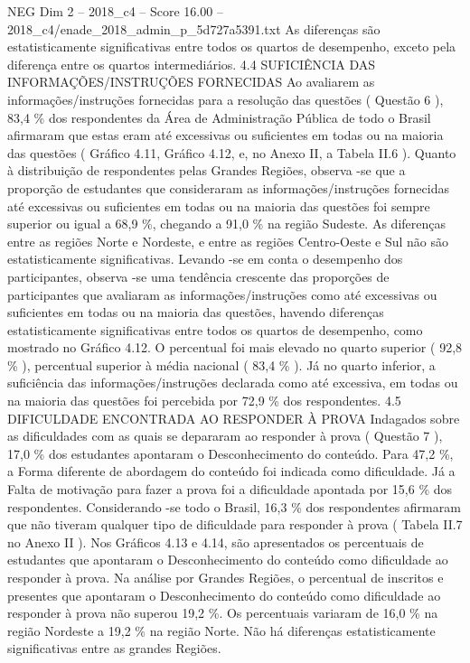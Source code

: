 \begin{textsample}{NEG Dim 2 – 2018\_c4 – Score 16.00 – 2018\_c4/enade\_2018\_admin\_p\_5d727a5391.txt}
As diferenças são estatisticamente significativas entre todos os quartos de desempenho, exceto pela diferença entre os quartos intermediários. 4.4 SUFICIÊNCIA DAS INFORMAÇÕES/INSTRUÇÕES FORNECIDAS Ao avaliarem as informações/instruções fornecidas para a resolução das questões ( Questão 6 ), 83,4 \% dos respondentes da Área de Administração Pública de todo o Brasil afirmaram que estas eram até excessivas ou suficientes em todas ou na maioria das questões ( Gráfico 4.11, Gráfico 4.12, e, no Anexo II, a Tabela II.6 ).
Quanto à distribuição de respondentes pelas Grandes Regiões, observa -se que a proporção de estudantes que consideraram as informações/instruções fornecidas até excessivas ou suficientes em todas ou na maioria das questões foi sempre superior ou igual a 68,9 \%, chegando a 91,0 \% na região Sudeste.
As diferenças entre as regiões Norte e Nordeste, e entre as regiões Centro-Oeste e Sul não são estatisticamente significativas.
Levando -se em conta o desempenho dos participantes, observa -se uma tendência crescente das proporções de participantes que avaliaram as informações/instruções como até excessivas ou suficientes em todas ou na maioria das questões, havendo diferenças estatisticamente significativas entre todos os quartos de desempenho, como mostrado no Gráfico 4.12.
O percentual foi mais elevado no quarto superior ( 92,8 \% ), percentual superior à média nacional ( 83,4 \% ).
Já no quarto inferior, a suficiência das informações/instruções declarada como até excessiva, em todas ou na maioria das questões foi percebida por 72,9 \% dos respondentes. 4.5 DIFICULDADE ENCONTRADA AO RESPONDER À PROVA Indagados sobre as dificuldades com as quais se depararam ao responder à prova ( Questão 7 ), 17,0 \% dos estudantes apontaram o Desconhecimento do conteúdo.
Para 47,2 \%, a Forma diferente de abordagem do conteúdo foi indicada como dificuldade.
Já a Falta de motivação para fazer a prova foi a dificuldade apontada por 15,6 \% dos respondentes.
Considerando -se todo o Brasil, 16,3 \% dos respondentes afirmaram que não tiveram qualquer tipo de dificuldade para responder à prova ( Tabela II.7 no Anexo II ).
Nos Gráficos 4.13 e 4.14, são apresentados os percentuais de estudantes que apontaram o Desconhecimento do conteúdo como dificuldade ao responder à prova.
Na análise por Grandes Regiões, o percentual de inscritos e presentes que apontaram o Desconhecimento do conteúdo como dificuldade ao responder à prova não superou 19,2 \%.
Os percentuais variaram de 16,0 \% na região Nordeste a 19,2 \% na região Norte.
Não há diferenças estatisticamente significativas entre as grandes Regiões.

\end{textsample}
